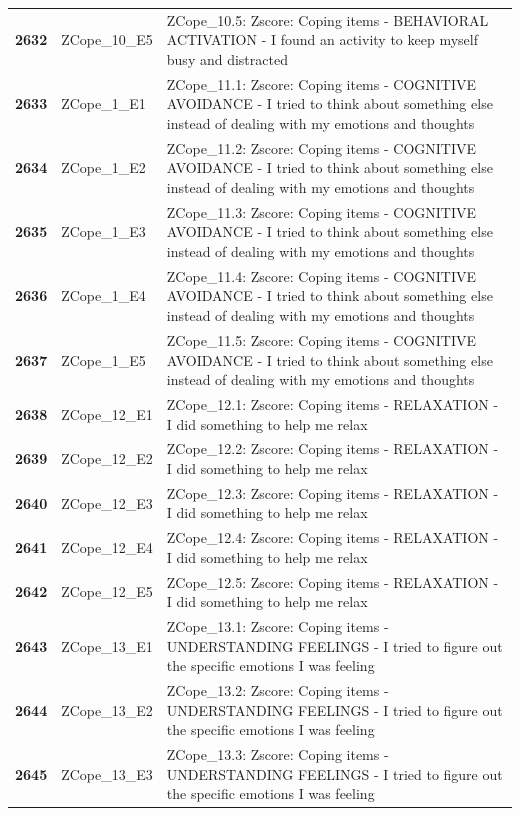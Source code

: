 \documentclass[
  letterpaper,
  DIV=11,
  numbers=noendperiod]{scrartcl}
\begin{document}
\begin{longtable}[t]{>{}cll}
\textbf{2632} & ZCope\_10\_E5 & ZCope\_10.5: Zscore:  Coping items - BEHAVIORAL ACTIVATION - I found an activity to keep myself busy and distracted\\
\textbf{2633} & ZCope\_1\_E1 & ZCope\_11.1: Zscore:  Coping items - COGNITIVE AVOIDANCE - I tried to think about something else instead of dealing with my emotions and thoughts\\
\textbf{2634} & ZCope\_1\_E2 & ZCope\_11.2: Zscore:  Coping items - COGNITIVE AVOIDANCE - I tried to think about something else instead of dealing with my emotions and thoughts\\
\textbf{2635} & ZCope\_1\_E3 & ZCope\_11.3: Zscore:  Coping items - COGNITIVE AVOIDANCE - I tried to think about something else instead of dealing with my emotions and thoughts\\
\addlinespace
\textbf{2636} & ZCope\_1\_E4 & ZCope\_11.4: Zscore:  Coping items - COGNITIVE AVOIDANCE - I tried to think about something else instead of dealing with my emotions and thoughts\\
\textbf{2637} & ZCope\_1\_E5 & ZCope\_11.5: Zscore:  Coping items - COGNITIVE AVOIDANCE - I tried to think about something else instead of dealing with my emotions and thoughts\\
\textbf{2638} & ZCope\_12\_E1 & ZCope\_12.1: Zscore:  Coping items - RELAXATION - I did something to help me relax\\
\textbf{2639} & ZCope\_12\_E2 & ZCope\_12.2: Zscore:  Coping items - RELAXATION - I did something to help me relax\\
\textbf{2640} & ZCope\_12\_E3 & ZCope\_12.3: Zscore:  Coping items - RELAXATION - I did something to help me relax\\
\addlinespace
\textbf{2641} & ZCope\_12\_E4 & ZCope\_12.4: Zscore:  Coping items - RELAXATION - I did something to help me relax\\
\textbf{2642} & ZCope\_12\_E5 & ZCope\_12.5: Zscore:  Coping items - RELAXATION - I did something to help me relax\\
\textbf{2643} & ZCope\_13\_E1 & ZCope\_13.1: Zscore:  Coping items - UNDERSTANDING FEELINGS - I tried to figure out the specific emotions I was feeling\\
\textbf{2644} & ZCope\_13\_E2 & ZCope\_13.2: Zscore:  Coping items - UNDERSTANDING FEELINGS - I tried to figure out the specific emotions I was feeling\\
\textbf{2645} & ZCope\_13\_E3 & ZCope\_13.3: Zscore:  Coping items - UNDERSTANDING FEELINGS - I tried to figure out the specific emotions I was feeling\\

\end{longtable}
\end{document}
